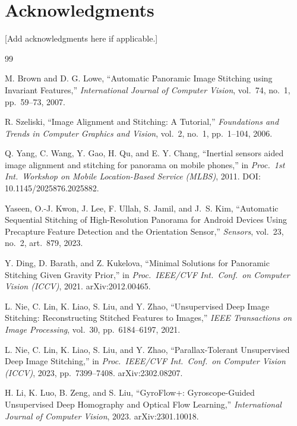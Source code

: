 \documentclass[11pt]{article}
\begin{document}
\section*{Acknowledgments}
[Add acknowledgments here if applicable.]

\begin{thebibliography}{99}

M. Brown and D. G. Lowe, ``Automatic Panoramic Image Stitching using Invariant Features,'' \textit{International Journal of Computer Vision}, vol.~74, no.~1, pp.~59--73, 2007.

R. Szeliski, ``Image Alignment and Stitching: A Tutorial,'' \textit{Foundations and Trends in Computer Graphics and Vision}, vol.~2, no.~1, pp.~1--104, 2006.

Q. Yang, C. Wang, Y. Gao, H. Qu, and E. Y. Chang, ``Inertial sensors aided image alignment and stitching for panorama on mobile phones,'' in \textit{Proc.\ 1st Int.\ Workshop on Mobile Location-Based Service (MLBS)}, 2011. DOI: 10.1145/2025876.2025882.

Yaseen, O.-J. Kwon, J. Lee, F. Ullah, S. Jamil, and J.~S. Kim, ``Automatic Sequential Stitching of High-Resolution Panorama for Android Devices Using Precapture Feature Detection and the Orientation Sensor,'' \textit{Sensors}, vol.~23, no.~2, art.\ 879, 2023.

Y. Ding, D. Barath, and Z. Kukelova, ``Minimal Solutions for Panoramic Stitching Given Gravity Prior,'' in \textit{Proc.\ IEEE/CVF Int.\ Conf.\ on Computer Vision (ICCV)}, 2021. arXiv:2012.00465.

L. Nie, C. Lin, K. Liao, S. Liu, and Y. Zhao, ``Unsupervised Deep Image Stitching: Reconstructing Stitched Features to Images,'' \textit{IEEE Transactions on Image Processing}, vol.~30, pp.~6184--6197, 2021.

L. Nie, C. Lin, K. Liao, S. Liu, and Y. Zhao, ``Parallax-Tolerant Unsupervised Deep Image Stitching,'' in \textit{Proc.\ IEEE/CVF Int.\ Conf.\ on Computer Vision (ICCV)}, 2023, pp.~7399--7408. arXiv:2302.08207.

H. Li, K. Luo, B. Zeng, and S. Liu, ``GyroFlow+: Gyroscope-Guided Unsupervised Deep Homography and Optical Flow Learning,'' \textit{International Journal of Computer Vision}, 2023. arXiv:2301.10018.


\end{thebibliography}
\end{document}
